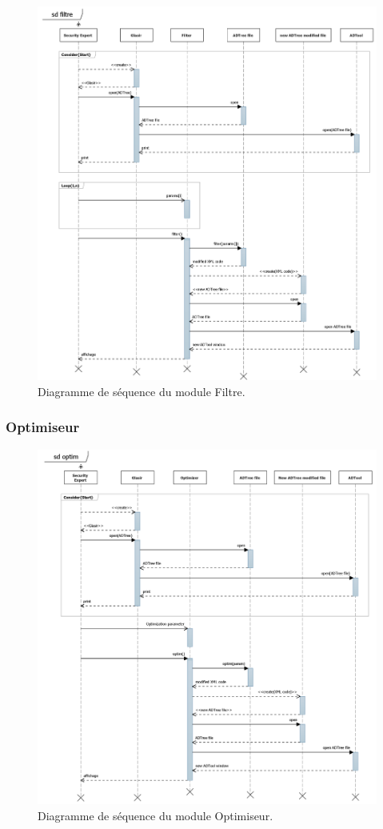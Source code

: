 	    \begin{figure}[H]
	        \centering
	        \includegraphics[height=1\textwidth]{figure/Filter.png}
	        \caption{Diagramme de séquence du module Filtre.}
	        \label{fig:filter}
	    \end{figure}

		\subsubsection{Optimiseur}

	    \begin{figure}[H]
	        \centering
	        \includegraphics[height=1\textwidth]{figure/Optim.png}
	        \caption{Diagramme de séquence du module Optimiseur.}
	        \label{fig:optim}
	    \end{figure}

